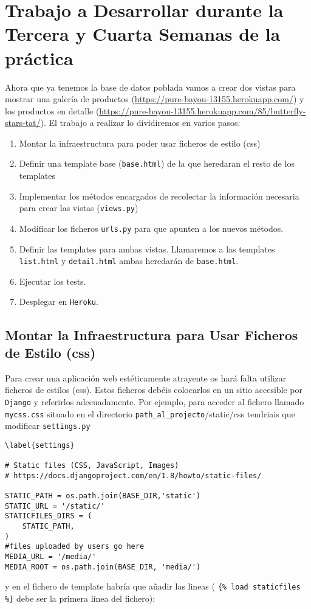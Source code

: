 \documentclass[12pt]{article} %
\newcommand{\herokuurl}[1]{\url{https://pure-bayou-13155.herokuapp.com/#1}}%
\newcommand{\hhh}[1]{\texttt{#1}}%
\newcommand{\views}{\texttt{views.py}}%
\newcommand{\urls}{\texttt{urls.py}}%
\newcommand{\django}{\texttt{Django}}%
\newcommand{\heroku}{\texttt{Heroku}}
\begin{document}
\section{Trabajo a Desarrollar durante la Tercera y Cuarta Semanas de la práctica} %

Ahora que ya tenemos la base de datos poblada vamos a crear dos vistas para mostrar una galería de productos (\herokuurl{}) y los productos en detalle (\herokuurl{85/butterfly-stars-tat/}). El trabajo a realizar lo dividiremos en varios pasos:

\begin{enumerate}
 \item Montar la infraestructura para poder usar ficheros de estilo (css)
 \item Definir una template base (\hhh{base.html}) de la que heredaran el resto de los templates
 \item Implementar los métodos encargados de recolectar la información necesaria para crear las vistas (\views)
 \item Modificar los ficheros \urls{} para que apunten a los nuevos métodos.
 \item Definir las templates para ambas vistas. Llamaremos a las templates \hhh{list.html} y \hhh{detail.html} ambas heredarán de \hhh{base.html}.
 \item Ejecutar los tests.
 \item Desplegar en \heroku.
 
\end{enumerate}

\subsection{Montar la Infraestructura para Usar Ficheros de Estilo (css)}

Para crear una aplicación web estéticamente atrayente os hará falta utilizar ficheros de estilos (css). Estos ficheros debéis colocarlos en un sitio accesible por \django{} y referirlos adecuadamente. Por ejemplo, para acceder al fichero llamado \texttt{mycss.css} situado en el directorio \texttt{path\_al\_projecto}/static/css tendriais que modificar \texttt{settings.py}

\begin{lstlisting}
\label{settings}

# Static files (CSS, JavaScript, Images)
# https://docs.djangoproject.com/en/1.8/howto/static-files/

STATIC_PATH = os.path.join(BASE_DIR,'static')
STATIC_URL = '/static/'
STATICFILES_DIRS = (
    STATIC_PATH,
)
#files uploaded by users go here
MEDIA_URL = '/media/'
MEDIA_ROOT = os.path.join(BASE_DIR, 'media/')

\end{lstlisting}
y en el fichero de template habría que añadir las lineas ( \texttt{\{\% load  staticfiles \%\}} debe ser la primera línea del fichero):
\end{document}
